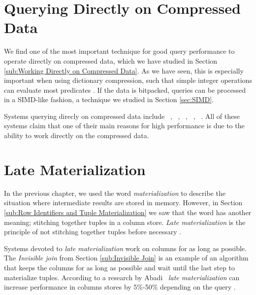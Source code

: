 \section{Querying Directly on Compressed Data}
\label{sec:Querying Directly on Compressed Data}
We find one of the most important technique for good query performance to operate directly on compressed data, which we have studied in Section \ref{sub:Working Directly on Compressed Data}. As we have seen, this is especially important when using dictionary compression, such that simple integer operations can evaluate most predicates \cite{Abadi2008-dd}. If the data is bitpacked, queries can be processed in a SIMD-like fashion, a technique we studied in Section \ref{sec:SIMD}.

Systems querying direcly on compressed data include \cstore~\cite{Stonebraker2005-qz}, \ibm~\cite{Raman2013-em}, \mssql~\cite{Larson2013-mc}, \blink~\cite{Johnson2008-cp}, \sapnw~\cite{Lemke2010-is}. All of these systems claim that one of their main reasons for high performance is due to the ability to work directly on the compressed data.

\section{Late Materialization}
\label{sec:Late Materialization}
In the previous chapter, we used the word \textit{materialization} to describe the situation where intermediate results are stored in memory. However, in Section \ref{sub:Row Identifiers and Tuple Materialization} we saw that the word has another meaning; stitching together tuples in a column store. \textit{Late materialization} is the principle of not stitching together tuples before necessary \cite{Abadi2008-dd}.

Systems devoted to \textit{late materialization} work on columns for as long as possible. The \textit{Invisible join} from Section \ref{sub:Invisible Join} is an example of an algorithm that keeps the columns for as long as possible and wait until the last step to materialize tuples. According to a research by Abadi \ea~\textit{late materialization} can increase performance in columns stores by 5\%-50\% depending on the query \cite{Abadi2008-dd}.

